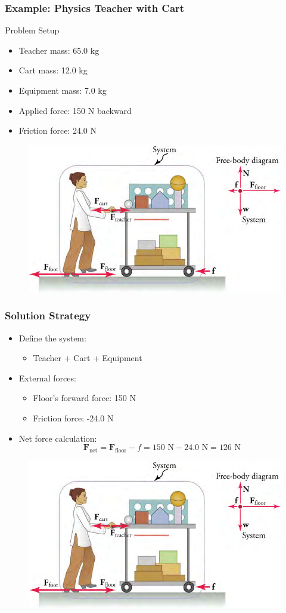 \documentclass{beamer}
\begin{document}
\begin{frame}
\frametitle{Example: Physics Teacher with Cart}
\begin{block}{Problem Setup}
\begin{itemize}
    \item Teacher mass: 65.0 kg
    \item Cart mass: 12.0 kg
    \item Equipment mass: 7.0 kg
    \item Applied force: 150 N backward
    \item Friction force: 24.0 N
\end{itemize}
\end{block}
\begin{figure}[H]
    \centering
    \includegraphics[width=0.5\linewidth]{CH4/Picture.png}
\end{figure}

\end{frame}

\begin{frame}
\frametitle{Solution Strategy}
\begin{itemize}
    \item Define the system:
    \begin{itemize}
        \item Teacher + Cart + Equipment
    \end{itemize}
    \item External forces:
    \begin{itemize}
        \item Floor's forward force: 150 N
        \item Friction force: -24.0 N
    \end{itemize}
    \item Net force calculation:
    \[\mathbf{F}_{\text{net}} = \mathbf{F}_{\text{floor}} - f = 150\text{ N} - 24.0\text{ N} = 126\text{ N}\]
\end{itemize}
\begin{figure}
    \centering
    \includegraphics[width=0.5\linewidth]{CH4/Picture.png}
\end{figure}
\end{frame}
\end{document}
